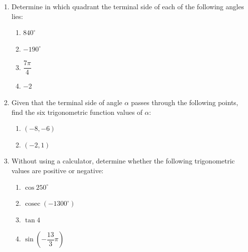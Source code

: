 \documentclass{report}
\begin{document}
\newpage


\begin{enumerate}
    \item Determine in which quadrant the terminal side of each of the following angles lies:
    \begin{multicols}{4}
        \begin{enumerate}[label=(\alph*)]
            \item $840^\circ$
            \item $-190^\circ$
            \item \vspace*{-1.2em}$\dfrac{7 \pi}{4}$
            \item $-2$
            \end{enumerate}
    \end{multicols}

    \item Given that the terminal side of angle $\alpha$ passes through the following points, find the six trigonometric function values of $\alpha$:
    \begin{multicols}{2}
        \begin{enumerate}[label=(\alph*)]
            \item $(-8,-6)$
            \item $(-2,1)$
            \end{enumerate}
    \end{multicols}

    \item Without using a calculator, determine whether the following trigonometric values are positive or negative:
    \begin{multicols}{4}
        \begin{enumerate}[label=(\alph*)]
            \item $\cos 250^\circ$
            \item $\operatorname{cosec} \left(-1300^\circ\right)$
            \item $\tan 4$
            \item $\sin \left(-\dfrac{13}{3} \pi\right)$
            \end{enumerate}
    \end{multicols}


\end{enumerate}
\end{document}

